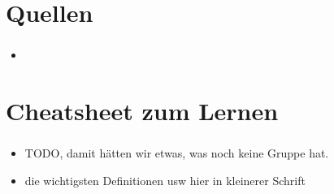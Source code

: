 \section{Quellen}

\begin{frame}
    \frametitle{\insertsection}
    \framesubtitle{\insertsubsection}

    \begin{itemize}
        \item
    \end{itemize}
\end{frame}

\section{Cheatsheet zum Lernen}

\begin{frame}
\frametitle{\insertsection}
\framesubtitle{\insertsubsection}

\begin{itemize}
    \item TODO, damit hätten wir etwas, was noch keine Gruppe hat.
    \item die wichtigsten Definitionen usw hier in kleinerer Schrift
\end{itemize}
\end{frame}
